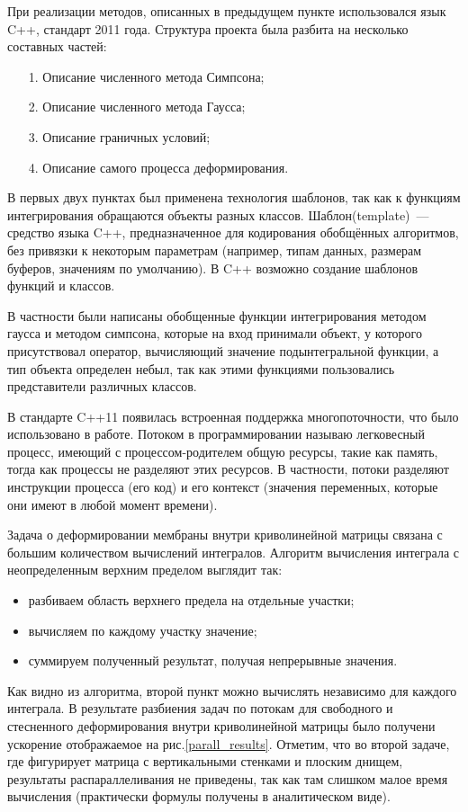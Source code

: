 При реализации методов, описанных в предыдущем пункте использовался язык C++, стандарт 2011 года.
Структура проекта была разбита на несколько составных частей:
\begin{itemize}
\item[1.] Описание численного метода Симпсона;
\item[2.] Описание численного метода Гаусса;
\item[3.] Описание граничных условий;
\item[4.] Описание самого процесса деформирования.
\end{itemize}

В первых двух пунктах был применена технология шаблонов, так как к функциям интегрирования обращаются объекты разных классов.
Шаблон(template)~--- средство языка C++, предназначенное для кодирования обобщённых алгоритмов, без привязки к некоторым параметрам (например, типам данных, размерам буферов, значениям по умолчанию). В C++ возможно создание шаблонов функций и классов.

В частности были написаны обобщенные функции интегрирования методом гаусса и методом симпсона, которые на вход принимали объект, у которого присутствовал оператор, вычисляющий значение подынтегральной функции, а тип объекта определен небыл, так как этими функциями пользовались представители различных классов. 

В стандарте C++11 появилась встроенная поддержка многопоточности, что было использовано в работе.
Потоком в программировании называю легковесный процесс, имеющий с процессом-родителем общую ресурсы, такие как память, тогда как процессы не разделяют этих ресурсов. В частности, потоки разделяют инструкции процесса (его код) и его контекст (значения переменных, которые они имеют в любой момент времени).

Задача о деформировании мембраны внутри криволинейной матрицы связана с большим количеством вычислений интегралов. Алгоритм вычисления интеграла с неопределенным верхним пределом выглядит так:
\begin{itemize}
\item разбиваем область верхнего предела на отдельные участки;
\item вычисляем по каждому участку значение;
\item суммируем полученный результат, получая непрерывные значения.
\end{itemize}

Как видно из алгоритма, второй пункт можно вычислять независимо для каждого интеграла. В результате разбиения задач по потокам для свободного и стесненного деформирования внутри криволинейной матрицы было получени ускорение отображаемое на рис.\ref{parall_results}. Отметим, что во второй задаче, где фигурирует матрица с вертикальными стенками и плоским днищем, результаты распараллеливания не приведены, так как там слишком малое время вычисления (практически формулы получены в аналитическом виде).

